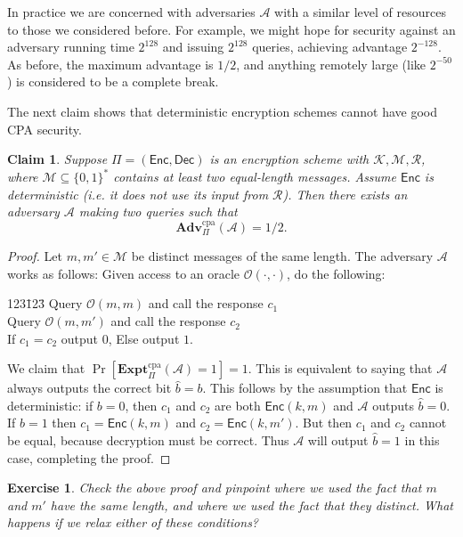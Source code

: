 \documentclass[11pt]{article}
\newtheorem{exercise}{Exercise}
\newtheorem{claim}{Claim}
\newcommand{\msgs}{\mathcal{M}}
\newcommand{\keys}{\mathcal{K}}
\newcommand{\rands}{\mathcal{R}}
\newcommand{\Enc}{\mathsf{Enc}}
\newcommand{\Dec}{\mathsf{Dec}}
\newcommand{\calA}{\mathcal{A}}
\newcommand{\calO}{\mathcal{O}}
\newcommand{\Adv}{\mathbf{Adv}}
\newcommand{\AdvCPA}[2]{\Adv^{\mathrm{cpa}}_{#1}({#2})}
\newcommand{\bits}{\{0,1\}}
\newcommand{\hatb}{\hat{b}}
\newcommand{\ExptCPA}{\mathbf{Expt}^{\mathrm{cpa}}}
\begin{document}
In practice we are concerned with adversaries $\calA$ with a similar level of
resources to those we considered before. For example, we might hope for
security against an adversary running time $2^{128}$ and issuing $2^{128}$
queries, achieving advantage $2^{-128}$. As before, the maximum advantage
is $1/2$, and anything remotely large (like $2^{-50}$) is considered to be
a complete break.

\bigskip

The next claim shows that deterministic encryption schemes cannot have
good CPA security.
\begin{claim}
    Suppose $\Pi=(\Enc,\Dec)$ is an encryption scheme with
    $\keys,\msgs,\rands$, where $\msgs\subseteq\bits^*$ contains at least two 
    equal-length messages. Assume
    $\Enc$ is deterministic (i.e. it does not use its input from $\rands$).
    Then there exists an adversary $\calA$ making two queries such that
    \[
        \AdvCPA{\Pi}{\calA} = 1/2.
    \]
\end{claim}
\begin{proof}
    Let $m,m'\in\msgs$ be distinct messages of the same length. The adversary
    $\calA$ works as follows: Given access to an oracle $\calO(\cdot,\cdot)$,
    do the following:

        \begin{tabbing}
            123\=123\=\kill
            \> Query $\calO(m,m)$ and call the response $c_1$\\
            \> Query $\calO(m,m')$ and call the response $c_2$\\
            \> If $c_1 = c_2$ output $0$, Else output $1$.
        \end{tabbing}

    We claim that $\Pr[\ExptCPA_\Pi(\calA) = 1]=1$. This is equivalent
    to saying that $\calA$ always outputs the correct bit $\hatb=b$.
    This follows by the assumption that $\Enc$ is deterministic:
    if $b=0$, then $c_1$ and $c_2$ are both $\Enc(k,m)$ and $\calA$
    outputs $\hatb=0$. If $b=1$ then $c_1 =\Enc(k,m)$ and $c_2 =\Enc(k,m')$.
    But then $c_1$ and $c_2$ cannot be equal, because decryption
    must be correct. Thus $\calA$ will output $\hatb=1$ in this case,
    completing the proof.
\end{proof}

\begin{exercise}
    Check the above proof and pinpoint where we used the fact that $m$ and $m'$
    have the same length, and where we used the fact that they distinct. What
    happens if we relax either of these conditions?
\end{exercise}
\end{document}
